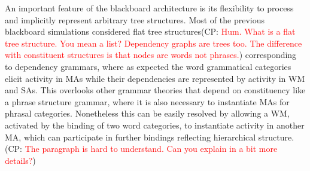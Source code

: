 \documentclass[10pt]{article}
\newcommand{\noteCP}[1]{(CP: \textcolor{red}{#1})}
\begin{document}
An important feature of the blackboard architecture is its flexibility
to process and implicitly represent arbitrary tree structures. Most of
the previous blackboard simulations considered flat tree
structures\noteCP{Hum. What is a flat tree structure. You mean a list?
  Dependency graphs are trees too. The difference with constituent
  structures is that nodes are words not phrases.} corresponding to
dependency grammars\cite{nivre2005dependency}, where as expected the
word grammatical categories elicit activity in MAs while their
dependencies are represented by activity in WM and SAs. This overlooks
other grammar theories that depend on constituency like a phrase
structure grammar\cite{gazdar1982phrase}, where it is also necessary
to instantiate MAs for phrasal categories. Nonetheless this can be
easily resolved by allowing a WM, activated by the binding of two word
categories, to instantiate activity in another MA, which can
participate in further bindings reflecting hierarchical structure.\noteCP{The paragraph is hard to understand. Can you explain in a bit more details?}
\end{document}

